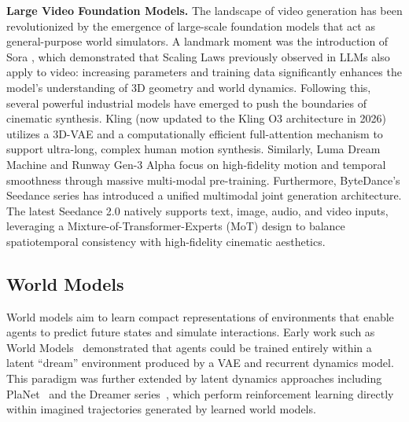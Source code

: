 \textbf{Large Video Foundation Models.} 
The landscape of video generation has been revolutionized by the emergence of large-scale foundation models that act as general-purpose world simulators. A landmark moment was the introduction of Sora \href{https://openai.com/index/video-generation-models-as-world-simulators/}{\cite{brooks2024video}}, which demonstrated that Scaling Laws \cite{kaplan2020scaling} previously observed in LLMs also apply to video: increasing parameters and training data significantly enhances the model's understanding of 3D geometry and world dynamics. 
Following this, several powerful industrial models have emerged to push the boundaries of cinematic synthesis. Kling \href{https://klingai.com/}{\cite{kuaishou2024kling}} (now updated to the Kling O3 architecture in 2026) utilizes a 3D-VAE and a computationally efficient full-attention mechanism to support ultra-long, complex human motion synthesis. Similarly, Luma Dream Machine \href{https://lumalabs.ai/dream-machine}{\cite{luma2024dream}} and Runway Gen-3 Alpha \href{https://runwayml.com/blog/introducing-gen-3-alpha/}{\cite{runway2024gen3}} focus on high-fidelity motion and temporal smoothness through massive multi-modal pre-training. 
 Furthermore, ByteDance's Seedance series \href{https://lf3-static.bytednsdoc.com/obj/eden-cn/bdeh7uhpsuht/Seedance%201.0%20Paper.pdf}{\cite{bytedance2025seedance}} has introduced a unified multimodal joint generation architecture. The latest Seedance 2.0 natively supports text, image, audio, and video inputs, leveraging a Mixture-of-Transformer-Experts (MoT) design to balance spatiotemporal consistency with high-fidelity cinematic aesthetics.

\subsection{World Models}
 
World models aim to learn compact representations of environments that enable agents to predict future states and simulate interactions. Early work such as World Models~\cite{ha2018world} demonstrated that agents could be trained entirely within a latent ``dream'' environment produced by a VAE and recurrent dynamics model. This paradigm was further extended by latent dynamics approaches including PlaNet~\cite{hafner2019planet} and the Dreamer series~\cite{hafner2019dream, hafner2020mastering, hafner2023mastering}, which perform reinforcement learning directly within imagined trajectories generated by learned world models.

